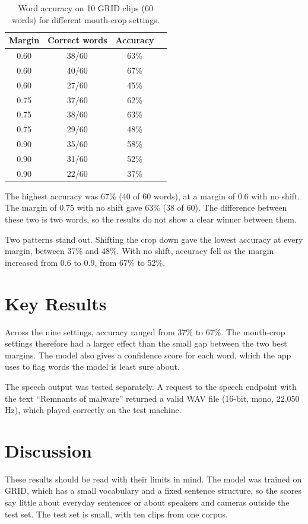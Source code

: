 \documentclass{FastFyp}
\begin{document}
\begin{table}[h]
\centering
\caption{Word accuracy on 10 GRID clips (60 words) for different mouth-crop settings.}
\label{tab:crop-results}
\begin{tabular}{|c|c|c|c|}
\hline
\textbf{Margin} & \textbf{Correct words} & \textbf{Accuracy} \\ \hline
0.60  & 38/60 & 63\% \\ \hline
0.60  & 40/60 & 67\% \\ \hline
0.60  & 27/60 & 45\% \\ \hline
0.75  & 37/60 & 62\% \\ \hline
0.75  & 38/60 & 63\% \\ \hline
0.75  & 29/60 & 48\% \\ \hline
0.90  & 35/60 & 58\% \\ \hline
0.90  & 31/60 & 52\% \\ \hline
0.90  & 22/60 & 37\% \\ \hline
\end{tabular}
\end{table}

The highest accuracy was 67\% (40 of 60 words), at a margin of 0.6 with no shift. The margin of 0.75 with no shift gave 63\% (38 of 60). The difference between these two is two words, so the results do not show a clear winner between them.

Two patterns stand out. Shifting the crop down gave the lowest accuracy at every margin, between 37\% and 48\%. With no shift, accuracy fell as the margin increased from 0.6 to 0.9, from 67\% to 52\%.

\section{Key Results}
Across the nine settings, accuracy ranged from 37\% to 67\%. The mouth-crop settings therefore had a larger effect than the small gap between the two best margins. The model also gives a confidence score for each word, which the app uses to flag words the model is least sure about.

The speech output was tested separately. A request to the speech endpoint with the text ``Remnants of malware'' returned a valid WAV file (16-bit, mono, 22,050 Hz), which played correctly on the test machine.

\section{Discussion}
These results should be read with their limits in mind. The model was trained on GRID, which has a small vocabulary and a fixed sentence structure, so the scores say little about everyday sentences or about speakers and cameras outside the test set. The test set is small, with ten clips from one corpus.
\end{document}
